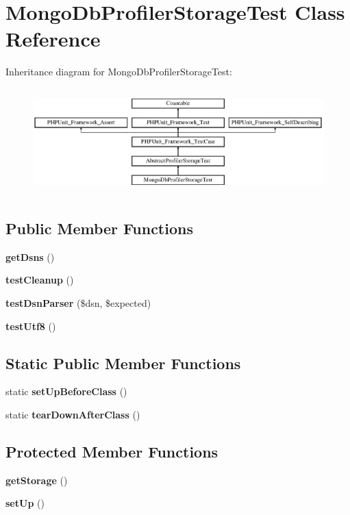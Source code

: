 \section{Mongo\+Db\+Profiler\+Storage\+Test Class Reference}
\label{class_symfony_1_1_component_1_1_http_kernel_1_1_tests_1_1_profiler_1_1_mongo_db_profiler_storage_test}
Inheritance diagram for Mongo\+Db\+Profiler\+Storage\+Test\+:\begin{figure}[H]
\begin{center}
\leavevmode
\includegraphics[height=4.129793cm]{class_symfony_1_1_component_1_1_http_kernel_1_1_tests_1_1_profiler_1_1_mongo_db_profiler_storage_test}
\end{center}
\end{figure}
\subsection*{Public Member Functions}
\begin{DoxyCompactItemize}
\item 
{\bf get\+Dsns} ()
\item 
{\bf test\+Cleanup} ()
\item 
{\bf test\+Dsn\+Parser} (\$dsn, \$expected)
\item 
{\bf test\+Utf8} ()
\end{DoxyCompactItemize}
\subsection*{Static Public Member Functions}
\begin{DoxyCompactItemize}
\item 
static {\bf set\+Up\+Before\+Class} ()
\item 
static {\bf tear\+Down\+After\+Class} ()
\end{DoxyCompactItemize}
\subsection*{Protected Member Functions}
\begin{DoxyCompactItemize}
\item 
{\bf get\+Storage} ()
\item 
{\bf set\+Up} ()
\end{DoxyCompactItemize}
